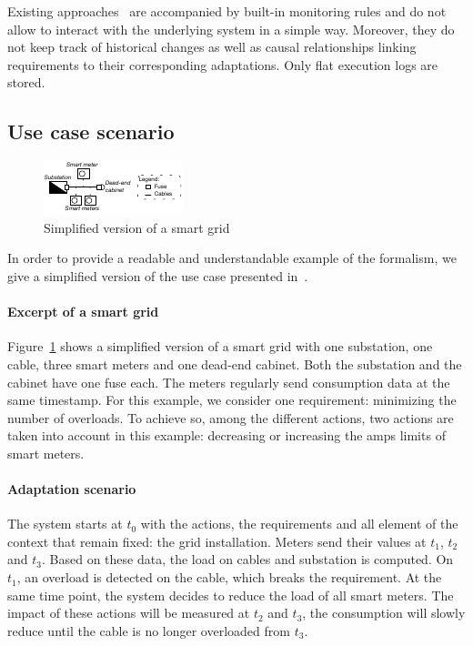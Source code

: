 Existing approaches~\cite{hassel13,DBLP:conf/models/HeinrichSJRMHRP14,DBLP:conf/icac/EhlersHWH11,DBLP:conf/icse/MendoncaAR14,DBLP:conf/icse/CasanovaGSA14,DBLP:conf/icse/IftikharW14a} are accompanied by built-in monitoring rules and do not allow to interact with the underlying system in a simple way. 
Moreover, they do not keep track of historical changes as well as causal relationships linking requirements to their corresponding adaptations. Only flat execution logs are stored. 

\subsection{Use case scenario}
\label{sec:tkm:intro:uc}

\begin{figure}
	\centering
	\includegraphics[width=\linewidth]{img/chapt-tkm/formalism/excerptSG}
	\caption{Simplified version of a smart grid}
	\label{fig:tkm:excerptSG}
\end{figure}

In order to provide a readable and understandable example of the formalism, we give a simplified version of the use case presented in~.

\paragraph{Excerpt of a smart grid}
Figure~\ref{fig:tkm:excerptSG} shows a simplified version of a smart grid with one substation, one cable, three smart meters and one dead-end cabinet.
Both the substation and the cabinet have one fuse each.
The meters regularly send consumption data at the same timestamp.
For this example, we consider one requirement: minimizing the number of overloads.
To achieve so, among the different actions, two actions are taken into account in this example: decreasing or increasing the amps limits of smart meters.

\paragraph{Adaptation scenario}
The system starts at $t_0$ with the actions, the requirements and all element of the context that remain fixed: the grid installation.
Meters send their values at $t_1$, $t_2$ and $t_3$.
Based on these data, the load on cables and substation is computed.
On $t_1$, an overload is detected on the cable, which breaks the requirement.
At the same time point, the system decides to reduce the load of all smart meters.
The impact of these actions will be measured at $t_2$ and $t_3$, \ie the consumption will slowly reduce until the cable is no longer overloaded from $t_3$.

